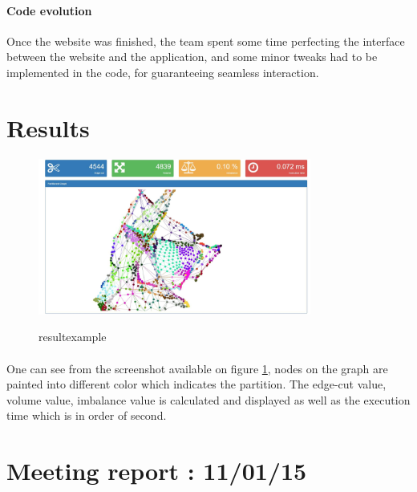 \documentclass{cranfieldChart}
\begin{document}
\paragraph{Code evolution}
Once the website was finished, the team spent some time perfecting the interface between the website and the application, and some minor tweaks had to be implemented in the code, for guaranteeing seamless interaction.



\section{Results}

\begin{figure}[h!]
\centering
\includegraphics[width=0.8\textwidth]{ressources/graph}
\label{resultexample}
\caption{resultexample}
\end{figure}

\paragraph{}
One can see from the screenshot available on figure \ref{resultexample}, nodes on the graph are painted into different color which indicates the partition. The edge-cut value, volume value, imbalance value is calculated and displayed as well as the execution time which is in order of second. 

\newpage
\appendix

\section{Meeting report : 11/01/15}
\end{document}
